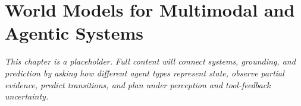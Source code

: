 \chapter{World Models for Multimodal and Agentic Systems}
\label{ch:world-models-agentic-systems}


\textit{This chapter is a placeholder. Full content will connect systems, grounding, and prediction by asking how different agent types represent state, observe partial evidence, predict transitions, and plan under perception and tool-feedback uncertainty.}
